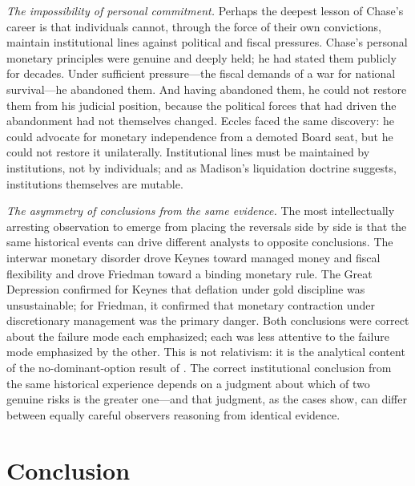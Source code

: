 \documentclass[12pt]{article}
\begin{document}
\textit{The impossibility of personal commitment.}  Perhaps the deepest
lesson of Chase's career is that individuals cannot, through the force
of their own convictions, maintain institutional lines against political
and fiscal pressures.  Chase's personal monetary principles were genuine
and deeply held; he had stated them publicly for decades.  Under
sufficient pressure---the fiscal demands of a war for national
survival---he abandoned them.  And having abandoned them, he could not
restore them from his judicial position, because the political forces
that had driven the abandonment had not themselves changed.  Eccles
faced the same discovery: he could advocate for monetary independence
from a demoted Board seat, but he could not restore it unilaterally.
Institutional lines must be maintained by institutions, not by
individuals; and as Madison's liquidation doctrine suggests, institutions
themselves are mutable.

\textit{The asymmetry of conclusions from the same evidence.}  The most
intellectually arresting observation to emerge from placing the reversals
side by side is that the same historical events can drive different
analysts to opposite conclusions.  The interwar monetary disorder drove
Keynes toward managed money and fiscal flexibility and drove Friedman
toward a binding monetary rule.  The Great Depression confirmed for
Keynes that deflation under gold discipline was unsustainable; for
Friedman, it confirmed that monetary contraction under discretionary
management was the primary danger.  Both conclusions were correct about
the failure mode each emphasized; each was less attentive to the failure
mode emphasized by the other.  This is not relativism: it is the
analytical content of the no-dominant-option result of \citet{Sargent2011}.
The correct institutional conclusion from the same historical experience
depends on a judgment about which of two genuine risks is the greater
one---and that judgment, as the cases show, can differ between equally
careful observers reasoning from identical evidence.


\section{Conclusion}
\end{document}
